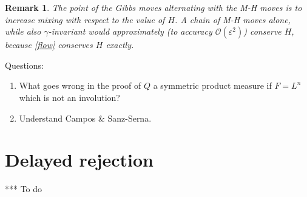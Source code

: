 \documentclass[10pt]{article}
\newcommand{\ben}{\begin{enumerate}}
\newcommand{\een}{\end{enumerate}}
\newcommand{\bigO}{{\mathcal O}}
\newtheorem{rmk}[thm]{Remark}
\newcommand{\eps}{\varepsilon}
\begin{document}
\begin{rmk}
  The point of the Gibbs moves alternating with the M-H moves
  is to increase mixing with respect to
  the value of $H$. A chain of M-H moves alone, while
  also $\gamma$-invariant would approximately
  (to accuracy $\bigO(\eps^2)$) conserve $H$, because \eqref{flow} conserves
  $H$ exactly.
\end{rmk}

Questions:
\ben
\item What goes wrong in the proof of $Q$ a symmetric product measure
  if $F=L^n$ which is not an involution?
\item Understand Campos \& Sanz-Serna.
\een
  



\section{Delayed rejection}

*** To do







\end{document}
